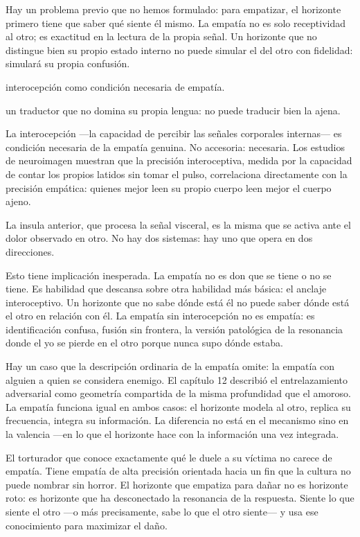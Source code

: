 \noindent Hay un problema previo que no hemos formulado: para empatizar, el horizonte primero tiene que saber qué siente él mismo. La empatía no es solo receptividad al otro; es exactitud en la lectura de la propia señal. Un horizonte que no distingue bien su propio estado interno no puede simular el del otro con fidelidad: simulará su propia confusión.

\begin{fisica}
 interocepción como condición necesaria de empatía.

 un traductor que no domina su propia lengua: no puede traducir bien la ajena.
\end{fisica}
La interocepción —la capacidad de percibir las señales corporales internas— es condición necesaria de la empatía genuina. No accesoria: necesaria. Los estudios de neuroimagen muestran que la precisión interoceptiva, medida por la capacidad de contar los propios latidos sin tomar el pulso, correlaciona directamente con la precisión empática: quienes mejor leen su propio cuerpo leen mejor el cuerpo ajeno.

La insula anterior, que procesa la señal visceral, es la misma que se activa ante el dolor observado en otro. No hay dos sistemas: hay uno que opera en dos direcciones.

Esto tiene implicación inesperada. La empatía no es don que se tiene o no se tiene. Es habilidad que descansa sobre otra habilidad más básica: el anclaje interoceptivo. Un horizonte que no sabe dónde está él no puede saber dónde está el otro en relación con él. La empatía sin interocepción no es empatía: es identificación confusa, fusión sin frontera, la versión patológica de la resonancia donde el yo se pierde en el otro porque nunca supo dónde estaba.

\noindent Hay un caso que la descripción ordinaria de la empatía omite: la empatía con alguien a quien se considera enemigo. El capítulo 12 describió el entrelazamiento adversarial como geometría compartida de la misma profundidad que el amoroso. La empatía funciona igual en ambos casos: el horizonte modela al otro, replica su frecuencia, integra su información. La diferencia no está en el mecanismo sino en la valencia —en lo que el horizonte hace con la información una vez integrada.

El torturador que conoce exactamente qué le duele a su víctima no carece de empatía. Tiene empatía de alta precisión orientada hacia un fin que la cultura no puede nombrar sin horror. El horizonte que empatiza para dañar no es horizonte roto: es horizonte que ha desconectado la resonancia de la respuesta. Siente lo que siente el otro —o más precisamente, sabe lo que el otro siente— y usa ese conocimiento para maximizar el daño.

